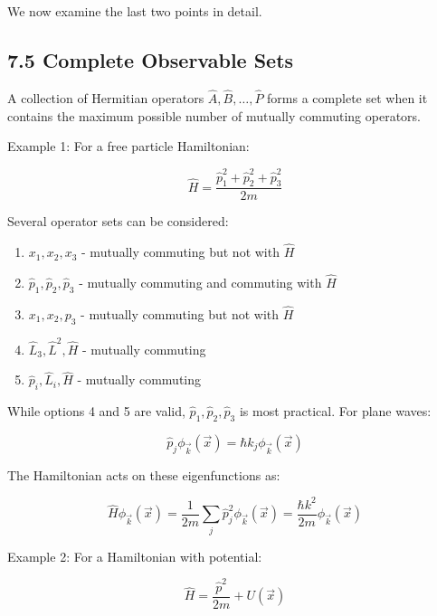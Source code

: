 \documentclass[10pt]{article}
\begin{document}
We now examine the last two points in detail.

\subsection*{7.5 Complete Observable Sets}
A collection of Hermitian operators $\hat{A}, \hat{B}, \ldots, \hat{P}$ forms a complete set when it contains the maximum possible number of mutually commuting operators.

Example 1: For a free particle Hamiltonian:

\begin{equation*}
\hat{H}=\frac{\hat{p}_{1}^{2}+\hat{p}_{2}^{2}+\hat{p}_{3}^{2}}{2 m} \tag{7.38}
\end{equation*}

Several operator sets can be considered:
\begin{enumerate}
  \item $x_{1}, x_{2}, x_{3}$ - mutually commuting but not with $\hat{H}$
  \item $\hat{p}_{1}, \hat{p}_{2}, \hat{p}_{3}$ - mutually commuting and commuting with $\hat{H}$
  \item $x_{1}, x_{2}, p_{3}$ - mutually commuting but not with $\hat{H}$
  \item $\hat{L}_{3}, \hat{L}^{2}, \hat{H}$ - mutually commuting
  \item $\hat{p}_{i}, \hat{L}_{i}, \hat{H}$ - mutually commuting
\end{enumerate}

While options 4 and 5 are valid, $\hat{p}_{1}, \hat{p}_{2}, \hat{p}_{3}$ is most practical. For plane waves:

\begin{equation*}
\hat{p}_{j} \phi_{\vec{k}}(\vec{x})=\hbar k_{j} \phi_{\vec{k}}(\vec{x}) \tag{7.39}
\end{equation*}

The Hamiltonian acts on these eigenfunctions as:

\begin{equation*}
\hat{H} \phi_{\vec{k}}(\vec{x})=\frac{1}{2 m} \sum_{j} \hat{p}_{j}^{2} \phi_{\vec{k}}(\vec{x})=\frac{\hbar k^{2}}{2 m} \phi_{\vec{k}}(\vec{x}) \tag{7.40}
\end{equation*}

Example 2: For a Hamiltonian with potential:

\begin{equation*}
\hat{H}=\frac{\hat{p}^{2}}{2 m}+U(\vec{x}) \tag{7.41}
\end{equation*}
\end{document}
